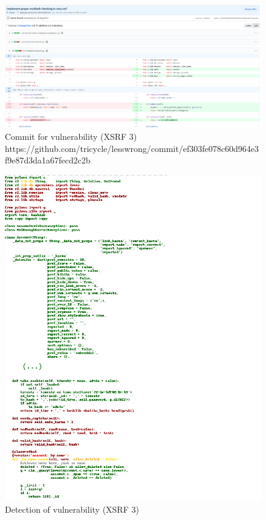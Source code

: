 \documentclass[
a4paper,
pagesize,
pdftex,
12pt,
twoside, %
BCOR=5mm, %
ngerman,
fleqn,
final,
]{scrartcl}
\begin{document}
	\begin{figure}[H]
		\centering
		\includegraphics[width=\linewidth]{Images/xsrfC}
		\caption{Commit for vulnerability (XSRF 3) \newline \scriptsize{https://github.com/tricycle/lesswrong/commit/ef303fe078c60d964e3f9e87d3da1a67fecd2c2b}}
		\label{fig:xsrfC}
	\end{figure}
	\begin{figure}[H]
		\centering
		\includegraphics[width=\linewidth]{Images/xsrfCr}
		\caption{Detection of vulnerability (XSRF 3)}
		\label{fig:xsrfCr}
	\end{figure}
	
\end{document}
